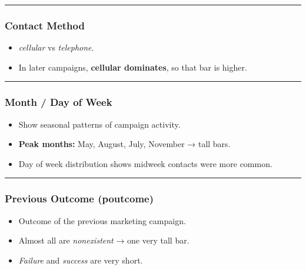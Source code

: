 \documentclass[
]{article}
\providecommand{\tightlist}{%
  \setlength{\itemsep}{0pt}\setlength{\parskip}{0pt}}
\begin{document}
\begin{center}\rule{0.5\linewidth}{0.5pt}\end{center}

\subsubsection{Contact Method}\label{contact-method}

\begin{itemize}
\tightlist
\item
  \emph{cellular} vs \emph{telephone}.\\
\item
  In later campaigns, \textbf{cellular dominates}, so that bar is
  higher.
\end{itemize}

\begin{center}\rule{0.5\linewidth}{0.5pt}\end{center}

\subsubsection{Month / Day of Week}\label{month-day-of-week}

\begin{itemize}
\tightlist
\item
  Show seasonal patterns of campaign activity.\\
\item
  \textbf{Peak months:} May, August, July, November → tall bars.\\
\item
  Day of week distribution shows midweek contacts were more common.
\end{itemize}

\begin{center}\rule{0.5\linewidth}{0.5pt}\end{center}

\subsubsection{Previous Outcome
(poutcome)}\label{previous-outcome-poutcome}

\begin{itemize}
\tightlist
\item
  Outcome of the previous marketing campaign.\\
\item
  Almost all are \emph{nonexistent} → one very tall bar.\\
\item
  \emph{Failure} and \emph{success} are very short.
\end{itemize}
\end{document}
